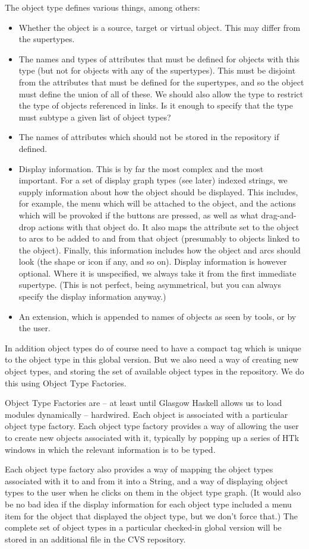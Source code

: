 \documentclass[a4paper]{article}
\begin{document}
The object type defines various things, among others:
\begin{itemize}
\item Whether the object is a source, target or virtual object.
      This may differ from the supertypes.
\item The names and types of attributes that must be defined for objects
      with this type (but not for objects with any of the supertypes).
      This must be disjoint from the attributes that must be defined for
      the supertypes, and so the object must define the union of all of
      these.  We should also allow the type to restrict the
      type of objects referenced in links.  Is it enough to specify
      that the type must subtype a given list of object types?
\item The names of attributes which should not be stored in the repository
      if defined.
\item Display information.  This is by far the most complex and the most
      important.
      For a set of display graph types (see later) indexed
      strings, we supply information about how the object should
      be displayed.  This includes, for example, the menu which will be
      attached to the object, and the actions which will be provoked if
      the buttons are pressed, as well as what drag-and-drop actions with
      that object do. It also maps the attribute set to the object to
      arcs to be added to and from that object (presumably to objects linked
      to the object).  Finally, this information includes how the object
      and arcs should look (the shape or icon if any, and so on).
      Display information is however optional.  Where it is unspecified,
      we always take it from the first immediate supertype.  (This is
      not perfect, being asymmetrical, but you can always specify the
      display information anyway.)
\item An extension, which is appended to names of objects as seen by
      tools, or by the user. 
\end{itemize}
In addition object types do of course need to have a compact tag which is 
unique to the object type in this global version.  But we also need a way
of creating new object types, and storing the set of available object types
in the repository.  We do this using Object Type Factories.  
\par
Object Type
Factories are -- at least until Glasgow Haskell allows us to load modules
dynamically -- hardwired.  Each object is associated with a particular
object type factory.  Each object type factory provides a way of
allowing the user to create new objects associated with it, typically
by popping up a series of HTk windows in which the relevant information
is to be typed.  
\par
Each object type factory also provides a way of
mapping the object types associated with it to and from it into a String, 
and a way of displaying object types to the user when he clicks on them in
the object type graph.  (It would also be no bad idea if the display 
information for each object type included a menu item for the object that
displayed the object type, but we don't force that.)  The complete set
of object types in a particular checked-in global version will be stored
in an additional file in the CVS repository.
\end{document}
